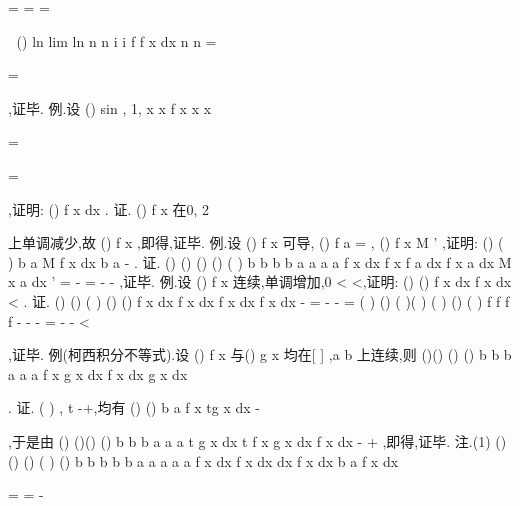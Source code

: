 =
=
\le 
=












\sum 
\sum 

\int 
()
ln lim
ln
n
n
i
i
f
f x dx
n
n
\to \infty 
=

=




\sum 
\int 
,证毕. 
\textcolor{lyred}{例}.设
()
sin
,
1,
x
x
f x
x
x

\neq 

=

=

,证明:
()
f x dx
\pi 
\pi 
\le 
\le 
\int 
. 
证.
()
f x 在0, 2
\pi 






上单调减少,故
()
f x
\pi \le 
\le ,即得,证毕. 
\textcolor{lyred}{例}.设
()
f x 可导,
()
f a =
,
()
f
x
M
'
\le 
,证明:
()
(
)
b
a
M
f x dx
b
a
\le 
-
\int 
. 
证.
()
()
()
()
(
)
b
b
b
b
a
a
a
a
f x dx
f x
f a dx
f
x
a dx
M
x
a dx
\psi 
'
=
-
=
-
\le 
-
\int 
\int 
\int 
\int 
,证毕. 
\textcolor{lyred}{例}.设
()
f x 连续,单调增加,0
\lambda 
<
<,证明:
()
()
f x dx
f x dx
\lambda 
\lambda 
<
\int 
\int 
. 
证.
()
()
(
)
()
()
f x dx
f x dx
f x dx
f x dx
\lambda 
\lambda 
\lambda 
\lambda 
\lambda 
\lambda 
-
=
-
-
=
\int 
\int 
\int 
\int 
(
)
()
(
)(
)
(
)
()
(
)
f
f
f
f
\lambda \lambda 
\psi 
\lambda 
\psi 
\lambda 
\lambda 
\lambda 
\psi 
\psi 
-
-
-
=
-
-
<




,证毕. 
\textcolor{lyred}{例(柯西积分不等式)}.设
()
f x 与()
g x 均在[
]
,a b 上连续,则 
()()
()
()
b
b
b
a
a
a
f x g x dx
f
x dx
g
x dx

\le 
\cdots 




\int 
\int 
\int 
. 
证.
(
)
,
t
\forall \in -\infty +\infty ,均有
()
()
b
a
f x
tg x
dx
-
\ge 




\int 
,于是由 
()
()()
()
b
b
b
a
a
a
t
g
x dx
t
f x g x dx
f
x dx
-
+
\ge 
\Rightarrow \Delta \le 
\int 
\int 
\int 
,即得,证毕. 
\textcolor{lyred}{注}.(1)
()
()
()
(
)
()
b
b
b
b
b
a
a
a
a
a
f x dx
f x dx
dx
f
x dx
b
a
f
x dx




=
\cdots 
\le 
\cdots 
=
-








